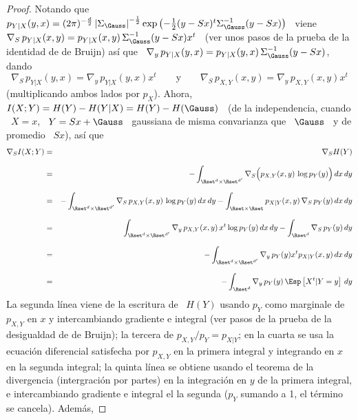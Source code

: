 %
\begin{proof}
  Notando  que \ $p_{Y|X}  (y,x) =  (2 \pi)^{-\frac{d}{2}}  \left| \Sigma_\Gauss
  \right|^{-\frac12}  \exp\left( -\frac12  (y-S  x)^t \Sigma_\Gauss^{-1}  (y-Sx)
  \right)$   \   viene  \   $\nabla_S   \,   p_{Y|X}(x,y)   =  p_{Y|X}(x,y)   \,
  \Sigma_\Gauss^{-1}  (y -  S x)  x^t$ \  (ver  unos pasos  de la  prueba de  la
  identidad de de  Bruijn) as\'i que \ $\nabla_y  \, p_{Y|X}(y,x) = p_{Y|X}(y,x)
  \, \Sigma_\Gauss^{-1} (y - S x)$, dando
  \[
  \nabla_S \, p_{Y|X}(y,x) = \nabla_y \, p_{Y|X}(y,x) x^t \qquad \mbox{y} \qquad
  \nabla_S \, p_{X,Y}(x,y) = \nabla_y \, p_{X,Y}(x,y) x^t
  \]
  (multiplicando ambos lados por $p_X$). Ahora, \ $I(X;Y) = H(Y) - H(Y|X) = H(Y)
  - H(\Gauss)$ \ (de la independencia, cuando \ $X  = x$, \ $Y = S x + \Gauss$ \
  gaussiana de misma convarianza que \ $\Gauss$  \ y de promedio \ $S x$), as\'i
  que
  \begin{eqnarray*}
  \nabla_S I(X;Y) & = & \nabla_S H(Y)\\[2.5mm]
  & = & - \int_{\Rset^d \times \Rset^{d'}} \nabla_S \Big( p_{X,Y}(x,y) \, \log
  p_Y(y) \Big) \, dx \, dy\\[2.5mm]
  & = & - \int_{\Rset^d \times \Rset^{d'}} \nabla_S \, p_{X,Y}(x,y) \, \log p_Y(y) \,
  dx \, dy - \int_{\Rset \times \Rset} p_{X|Y}(x,y) \, \nabla_S \, p_Y(y) \, dx \,
  dy\\[2.5mm]
  & = & \int_{\Rset^d \times \Rset^{d'}} \nabla_y \, p_{X,Y}(x,y) \, x^t \log p_Y(y)
  \, dx \, dy - \int_{\Rset^d} \nabla_S \, p_Y(y) \, dy\\[2.5mm]
  & = & - \int_{\Rset^d \times \Rset^{d'}} \nabla_y \, p_Y(y) x^t p_{X|Y}(x,y) \, dx
  \, dy\\[2.5mm]
  & = & - \int_{\Rset^d} \nabla_y \, p_Y(y) \, \Esp\left[X^t | Y = y \right] \, dy
  \end{eqnarray*}
  La  segunda l\'inea  viene  de la  escritura  de \  $H(Y)$  usando $p_Y$  como
  marginale de $p_{X,Y}$ en $x$ y intercambiando gradiente e integral (ver pasos
  de la  prueba de la  desigualdad de de  Bruijn); la tercera de  $p_{X,Y}/p_Y =
  p_{X|Y}$;  en  la cuarta  se  usa  la  ecuaci\'on diferencial  satisfecha  por
  $p_{X,Y}$ en la  primera integral y integrando en $x$  en la segunda integral;
  la  quinta   l\'inea  se   obtiene  usando  el   teorema  de   la  divergencia
  (intergraci\'on por partes) en la integraci\'on en $y$ de la primera integral,
  e intercambiando  gradiente e integral  el la segunda  ($p_Y$ sumando a  1, el
  t\'ermino se cancela). Adem\'as,

\end{proof}
